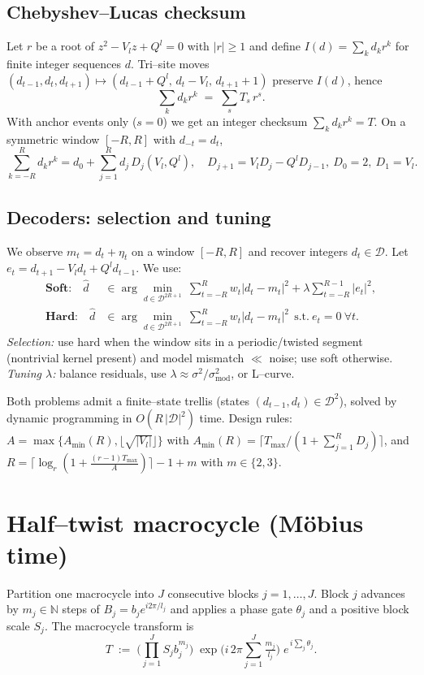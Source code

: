 \documentclass[11pt]{article}
\theoremstyle{definition}
\theoremstyle{remark}
\newcommand{\N}{\mathbb{N}}
\begin{document}
\subsection{Chebyshev--Lucas checksum}
Let $r$ be a root of $z^2 - V_l z + Q^l=0$ with $|r|\ge 1$ and define $I(d)=\sum_k d_k r^k$ for finite integer sequences $d$.
Tri--site moves $(d_{t-1},d_t,d_{t+1})\mapsto(d_{t-1}+Q^l,\,d_t-V_l,\,d_{t+1}+1)$ preserve $I(d)$, hence
\begin{equation}\label{eq:checksum}
\sum_k d_k r^k \;=\; \sum_s T_s\, r^{s}.
\end{equation}
With anchor events only ($s=0$) we get an integer checksum $\sum_k d_k r^k=T$. On a symmetric window $[-R,R]$ with $d_{-t}=d_t$,
\begin{equation}\label{eq:dickson}
\sum_{k=-R}^{R} d_k r^k = d_0 + \sum_{j=1}^{R} d_j\,D_j(V_l,Q^l),\quad D_{j+1}=V_l D_j - Q^l D_{j-1},\ D_0=2,\ D_1=V_l.
\end{equation}

\subsection{Decoders: selection and tuning}\label{subsec:decoders}
We observe $m_t=d_t+\eta_t$ on a window $[-R,R]$ and recover integers $d_t\in\mathcal D$.
Let $e_t=d_{t+1}-V_l d_t + Q^l d_{t-1}$. We use:
\begin{align}
\textbf{Soft:}\quad
\hat d&\in \arg\min_{d\in\mathcal D^{2R+1}} \ \sum_{t=-R}^R w_t |d_t-m_t|^2 + \lambda \sum_{t=-R}^{R-1} |e_t|^2,\label{eq:soft}\\
\textbf{Hard:}\quad
\hat d&\in \arg\min_{d\in\mathcal D^{2R+1}} \ \sum_{t=-R}^R w_t |d_t-m_t|^2 \ \ \text{s.t.}\ e_t=0\ \forall t.\label{eq:hard}
\end{align}
\emph{Selection:} use hard when the window sits in a periodic/twisted segment (nontrivial kernel present) and model mismatch $\ll$ noise;
use soft otherwise. \emph{Tuning $\lambda$:} balance residuals, use $\lambda\approx \sigma^2/\sigma_{\mathrm{mod}}^2$, or L--curve.

Both problems admit a finite--state trellis (states $(d_{t-1},d_t)\in\mathcal D^2$), solved by dynamic programming in $O(R\,|\mathcal D|^2)$ time.
Design rules: $A=\max\{A_{\min}(R),\lfloor\sqrt{|V_l|}\rfloor\}$ with $A_{\min}(R)=\big\lceil T_{\max}/(1+\sum_{j=1}^{R} D_j)\big\rceil$, and
$R=\lceil \log_r(1+\tfrac{(r-1)T_{\max}}{A})\rceil-1+m$ with $m\in\{2,3\}$.

\section{Half--twist macrocycle (Möbius time)}\label{sec:macrocycle}
Partition one macrocycle into $J$ consecutive blocks $j=1,\dots,J$. Block $j$ advances by $m_j\in\N$ steps of
$B_j=b_j e^{i 2\pi/l_j}$ and applies a phase gate $\theta_j$ and a positive block scale $S_j$.
The macrocycle transform is
\begin{equation}\label{eq:Tmacro}
T \;:=\; \Big(\prod_{j=1}^J S_j b_j^{m_j}\Big)\;\exp\!\Big(i\,2\pi\sum_{j=1}^J \tfrac{m_j}{l_j}\Big)\; e^{\,i\sum_j \theta_j}.
\end{equation}
\end{document}
